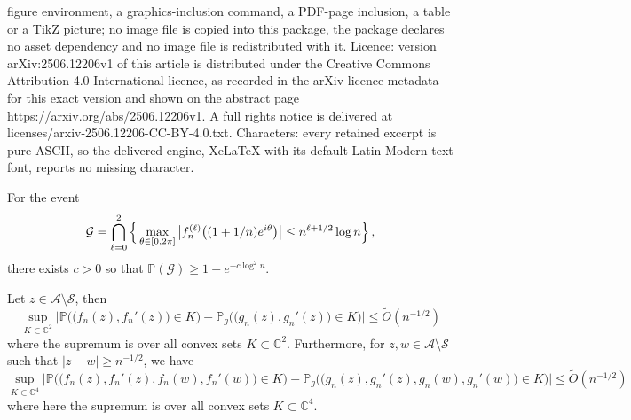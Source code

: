 \documentclass[10pt,a4paper]{amsart}
\newcommand{\I}{{\rm i}}
\newcommand{\Otilde}{\widetilde{O}}
\renewcommand{\P}{\mathbb P}
\newcommand{\bC}{\mathbb C}
\newcommand{\cA}{\mathcal A}
\newcommand{\cG}{\mathcal G}
\begin{document}
figure environment, a graphics-inclusion command, a PDF-page inclusion, a table or a TikZ picture; no image file is copied into this package, the package declares no asset dependency and no image file is redistributed with it. Licence: version arXiv:2506.12206v1 of this article is distributed under the Creative Commons Attribution 4.0 International licence, as recorded in the arXiv licence metadata for this exact version and shown on the abstract page https://arxiv.org/abs/2506.12206v1. A full rights notice is delivered at licenses/arxiv-2506.12206-CC-BY-4.0.txt. Characters: every retained excerpt is pure ASCII, so the delivered engine, XeLaTeX with its default Latin Modern text font, reports no missing character.
    \begin{lemma} \label{lemma:Salem-Zygmund}
    For the event
     \begin{equation} \label{eq:G-def}
    \mathcal{G} = \bigcap_{\ell=0}^{2} \Big\{ \max_{\theta\in[0,2\pi]} \big|f_n^{(\ell)}\big((1+1/n) e^{\I \theta}\big)\big| \le n^{\ell + 1/2} \log n\Big\}  \, ,
    \end{equation}
    there exists $c>0$ so that $\P(\cG) \ge 1 -  e^{-c\log^2 n}$.
    \end{lemma}

    \begin{lemma}
        \label{lemma:berry_esseen_in_annulus}
        Let $z\in \cA\setminus \mathcal{S}$, then
        \begin{equation*}
        \sup_{K \subset \bC^2}\Big| \P\Big( \big(f_n(z),f_n'(z)\big) \in K \Big) - \P_g\Big( \big(g_n(z),g_n'(z)\big) \in K \Big) \Big| \leq 
        \Otilde(n^{-1/2})
        \end{equation*}
        where the supremum is over all convex sets $K\subset \bC^2$. Furthermore, for $z,w\in \cA\setminus \mathcal{S}$ such that $|z-w|\ge n^{-1/2}$, we have
        \begin{equation*}
        \sup_{K \subset \bC^4}\Big| \P\Big( \big(f_n(z),f_n'(z),f_n(w),f_n'(w)\big) \in K \Big) - \P_g\Big( \big(g_n(z),g_n'(z),g_n(w),g_n'(w)\big) \in K \Big) \Big| \leq 
        \Otilde(n^{-1/2})
        \end{equation*}
        where here the supremum is over all convex sets $K\subset \bC^4$. 
        \end{lemma}
\end{document}
